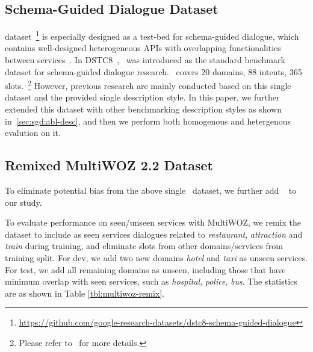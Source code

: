 \subsection{Schema-Guided Dialogue Dataset}
\label{ssec:sgd:schema-dataset}
\sgdst
dataset~\footnote{\url{https://github.com/google-research-datasets/dstc8-schema-guided-dialogue}}
is especially designed as a test-bed for schema-guided dialogue, which
contains well-designed heterogeneous APIs with overlapping
functionalities between services~\citep{rastogi2019towards}. In
DSTC8~\citep{rastogi2020schema}, \sgdst~was introduced as the standard
benchmark dataset for schema-guided dialogue research. \sgdst~covers 20
domains, 88 intents, 365 slots.~\footnote{Please refer to~\citet{rastogi2019towards} for more details.} However, previous research are mainly
conducted based on this single dataset and the provided single
description style. In this paper, we further extended this dataset
with other benchmarking description styles as shown in~\autoref{sec:sgd:abl-desc}, and then we perform both homogenous and
hetergenous evalution on it.

\subsection{Remixed MultiWOZ 2.2 Dataset}
\label{ssec:sgd:multiwoz-dataset}

To eliminate potential bias from the above single \sgdst~dataset, we
further add \multiwoz~\citep{zang-etal-2020-multiwoz} to our study.

To evaluate performance on seen/unseen services with MultiWOZ, we
remix the \multiwoz dataset to include as seen services dialogues
related to \textit{restaurant}, \textit{attraction} and \textit{train}
during training, and eliminate slots from other domains/services from
training split.  For dev, we add two new domains {\it hotel} and {\it
  taxi} as unseen services. For test, we add all remaining domains as
unseen, including those that have minimum overlap with seen services,
such as {\it hospital}, {\it police}, {\it bus}. The statistics are as
shown in Table \ref{tbl:multiwoz-remix}.

